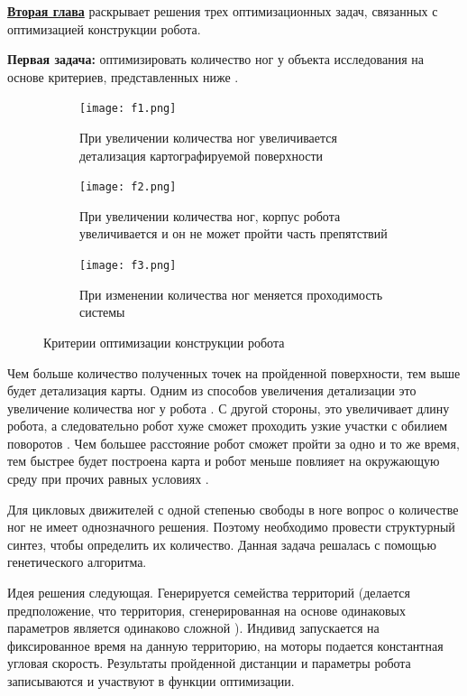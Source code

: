 
\textbf{\underline{Вторая глава}} раскрывает решения трех оптимизационных задач, связанных с оптимизацией конструкции робота.

\textbf{Первая задача:} оптимизировать количество ног у объекта исследования на основе критериев, представленных ниже . 

\begin{figure}[H]
    \begin{subfigure}{0.49\textwidth}
        \centering\texttt{[image: f1.png]}
        \caption{При увеличении количества ног увеличивается детализация картографируемой поверхности}
        \label{fig:f1.png}
    \end{subfigure}
    \begin{subfigure}{0.49\textwidth}
        \centering\texttt{[image: f2.png]}
        \caption{При увеличении количества ног, корпус робота увеличивается и он не может пройти часть препятствий}
        \label{fig:f2.png}
    \end{subfigure}

    \hfill
    \begin{subfigure}{\textwidth}
        \centering\texttt{[image: f3.png]}
        \caption{При изменении количества ног меняется проходимость системы}
        \label{fig:f3.png}
    \end{subfigure}
    \hfill

\caption{Критерии оптимизации конструкции робота}
\label{fig:opti_criteria}
\end{figure}
Чем больше количество полученных точек на пройденной поверхности, тем выше будет детализация карты. Одним из способов увеличения детализации это увеличение количества ног у робота . С другой стороны, это увеличивает длину робота, а следовательно робот хуже сможет проходить узкие участки с обилием поворотов . Чем большее расстояние робот сможет пройти за одно и то же время, тем быстрее будет построена карта и робот меньше повлияет на окружающую среду при прочих равных условиях . 

Для цикловых движителей с одной степенью свободы в ноге вопрос о количестве ног не имеет однозначного решения. Поэтому необходимо провести структурный синтез, чтобы определить их количество. Данная задача решалась с помощью генетического алгоритма.

Идея решения следующая. Генерируется семейства территорий (делается предположение, что территория, сгенерированная на основе одинаковых параметров является одинаково сложной ). Индивид запускается на фиксированное время на данную территорию, на моторы подается константная угловая скорость. Результаты пройденной дистанции и параметры робота записываются и участвуют в функции оптимизации.

